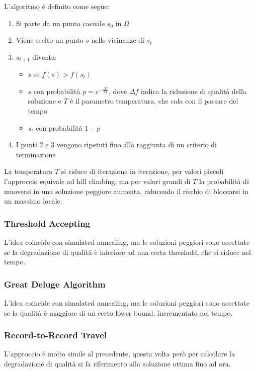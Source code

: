 \documentclass[a4paper]{article}
\begin{document}
L'algoritmo è definito come segue:
\begin{enumerate}
    \item Si parte da un punto casuale $s_0$ in $\Omega$
    \item Viene scelto un punto $s$ nelle vicinanze di $s_t$ 
    \item $s_{t+1}$ diventa:
        \begin{itemize}
            \item $s$ se $f(s) > f(s_t)$
            \item $s$ con probabilità $p = e^{-\frac{\Delta f}{kT}}$, dove $\Delta f$ 
            indica la riduzione di qualità della soluzione e $T$ è il parametro temperatura, che
            cala con il passare del tempo
            \item $s_t$ con probabilità $1- p$
        \end{itemize}
    \item I punti 2 e 3 vengono ripetuti fino alla raggiunta di un criterio di terminazione
\end{enumerate}
La temperatura $T$ si riduce di iterazione in iterazione, per valori
 piccoli l'approccio equivale ad hill climbing, ma per valori grandi di $T$
la probabilità di muoversi in una soluzione peggiore aumenta, riducendo il rischio di bloccarsi 
in un massimo locale.

\subsubsection{Threshold Accepting}
L'idea coincide con simulated annealing, ma le soluzioni peggiori sono accettate 
se la degradazione di qualità è inferiore ad una certa threshold, che si riduce
nel tempo.

\subsubsection{Great Deluge Algorithm}
L'idea coincide con simulated annealing, ma le soluzioni peggiori sono accettate 
se la qualità è maggiore di un certo lower bound, incrementato nel tempo.

\subsubsection{Record-to-Record Travel}
L'approccio è molto simile al precedente, questa volta però per calcolare la degradazione 
di qualità si fa riferimento alla soluzione ottima fino ad ora.
\end{document}
